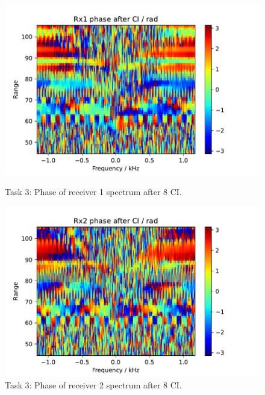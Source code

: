\begin{figure}
    \centering
    \begin{minipage}{0.48\textwidth}
        \centering
        \includegraphics[width=\textwidth]{graphics/t3/t3-phase-rx1.pdf}
    \caption{Task 3: Phase of receiver 1 spectrum after 8 CI.}
    \label{fig:t3-phase-rx1}
    \end{minipage}\hfill
    \begin{minipage}{0.48\textwidth}
        \centering
        \includegraphics[width=\textwidth]{graphics/t3/t3-phase-rx2.pdf}
    \caption{Task 3: Phase of receiver 2 spectrum after 8 CI.}
    \label{fig:t3-phase-rx2}
    \end{minipage}
\end{figure}
